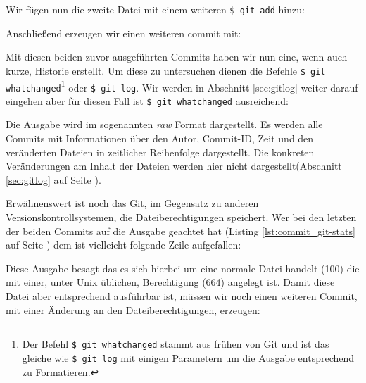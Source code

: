 Wir fügen nun die zweite Datei mit einem weiteren \texttt{\$ git add} hinzu:



Anschließend erzeugen wir einen weiteren \gls{commit} mit:



Mit diesen beiden zuvor ausgeführten Commits haben wir nun eine, wenn auch
kurze, Historie erstellt. Um diese zu untersuchen dienen die Befehle \texttt{\$
git whatchanged}\footnote{Der Befehl \texttt{\$ git whatchanged} stammt aus
frühen von Git und ist das gleiche wie \texttt{\$ git log} mit einigen
Parametern um die Ausgabe entsprechend zu Formatieren.} oder \texttt{\$ git
log}. Wir werden in Abschnitt \ref{sec:gitlog} weiter darauf eingehen aber für
diesen Fall ist \texttt{\$ git whatchanged} ausreichend:



Die Ausgabe wird im sogenannten \textit{raw} Format dargestellt. Es werden alle
Commits mit Informationen über den Autor, Commit-ID, Zeit und den veränderten
Dateien in zeitlicher Reihenfolge dargestellt. Die konkreten Veränderungen am
Inhalt der Dateien werden hier nicht dargestellt(Abschnitt \ref{sec:gitlog} auf
Seite \pageref{sec:gitlog}).

Erwähnenswert ist noch das Git, im Gegensatz zu anderen
Versionskontrollsystemen, die Dateiberechtigungen speichert. Wer bei den
letzten der beiden Commits auf die Ausgabe geachtet hat (Listing
\ref{lst:commit_git-stats} auf Seite \pageref{lst:commit_git-stats}) dem ist
vielleicht folgende Zeile aufgefallen:



Diese Ausgabe besagt das es sich hierbei um eine normale Datei handelt (100)
die mit einer, unter Unix üblichen, Berechtigung (664) angelegt ist. Damit
diese Datei aber entsprechend ausführbar ist, müssen wir noch einen weiteren
Commit, mit einer Änderung an den Dateiberechtigungen, erzeugen:



